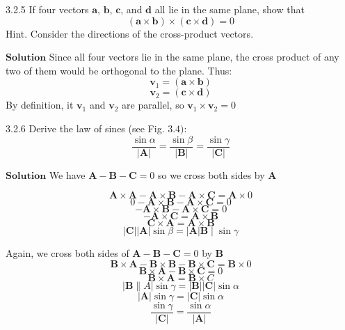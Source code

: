 $$$$



\begin{mybox}{3.2.5}
If four vectors $\mathbf{a}$, $\mathbf{b}$, $\mathbf{c}$, and $\mathbf{d}$ all lie in the same plane, show that
$$
(\mathbf{a} \times \mathbf{b}) \times(\mathbf{c} \times \mathbf{d})=0
$$
Hint. Consider the directions of the cross-product vectors.
\end{mybox}

$\boxed{\textbf{Solution}}$ Since all four vectors lie in the same plane, the cross product of any two of them would be orthogonal to the plane. Thus:
$$\mathbf{v}_1 = (\mathbf{a} \times \mathbf{b})$$
$$\mathbf{v}_2 = (\mathbf{c} \times \mathbf{d})$$
By definition, it $\mathbf{v}_1$ and $\mathbf{v}_2$ are parallel, so $\mathbf{v}_1 \times \mathbf{v}_2 = 0$


\newpage



\begin{mybox}{3.2.6}
Derive the law of sines (see Fig. $3.4):$
$$
\dfrac{\sin \alpha}{|\mathbf{A}|}=\dfrac{\sin \beta}{|\mathbf{B}|}=\dfrac{\sin \gamma}{|\mathbf{C}|}
$$
\end{mybox}


$\boxed{\textbf{Solution}}$ We have $\mathbf{A}-\mathbf{B}-\mathbf{C}=0$ so we cross both sides by $\mathbf{A}$ 



$$\mathbf{A} \times \mathbf{A}-\mathbf{A} \times \mathbf{B}-\mathbf{A} \times \mathbf{C}=\mathbf{A} \times 0$$
$$ 0-\mathbf{A} \times \mathbf{B}-\mathbf{A} \times \mathbf{C}=0$$
$$-\mathbf{A} \times \mathbf{B}-\mathbf{A} \times \mathbf{C}=0$$
$$-\mathbf{A} \times \mathbf{C}=\mathbf{A} \times \mathbf{B}$$
$$ \mathbf{C} \times \mathbf{A}=\mathbf{A} \times \mathbf{B}$$
$$|\mathbf{C}||\mathbf{A}| \sin \beta=|\mathbf{A}| \mathbf{B} \mid \sin \gamma$$

Again, we cross both sides of $\mathbf{A}-\mathbf{B}-\mathbf{C}=0$ by $\mathbf{B}$
$$\mathbf{B} \times \mathbf{A}-\mathbf{B} \times \mathbf{B}-\mathbf{B} \times \mathbf{C}=\mathbf{B} \times 0$$
$$ \mathbf{B} \times \mathbf{A}-\mathbf{B} \times \mathbf{C}=0$$
$$ \mathbf{B} \times \mathbf{A}=\mathbf{B} \times C$$
$$|\mathbf{B} \| A| \sin \gamma=|\mathbf{B}||\mathbf{C}| \sin \alpha$$
$$|\mathbf{A}| \sin \gamma=|\mathbf{C}| \sin \alpha$$
$$ \frac{\sin \gamma}{|\mathbf{C}|}=\frac{\sin \alpha}{|\mathbf{A}|} $$



\newpage



